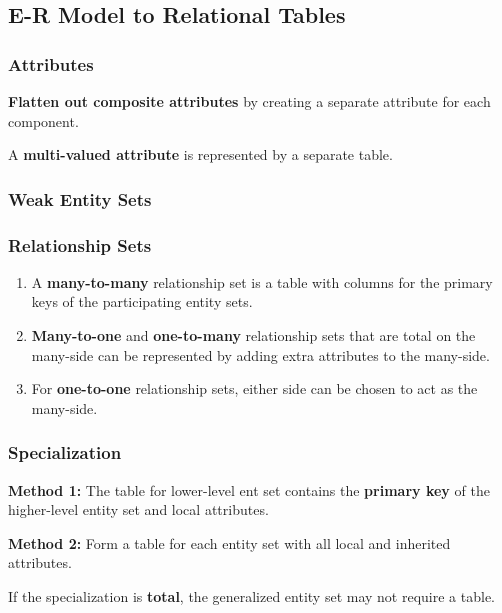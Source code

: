 \documentclass[11pt,a4paper]{article}
\begin{document}
\subsection{E-R Model to Relational Tables}
\subsubsection{Attributes}
\textbf{Flatten out composite attributes} by creating a separate attribute for each component.

A \textbf{multi-valued attribute} is represented by a separate table.

\subsubsection{Weak Entity Sets}

\subsubsection{Relationship Sets}
\begin{enumerate}
    \item [1.] A \textbf{many-to-many} relationship set is a table with columns for the primary keys of the participating entity sets.
    
    \item [2.]\textbf{Many-to-one} and \textbf{one-to-many} relationship sets that are total on the many-side can be represented by adding extra attributes to the many-side.
    
    \item [3.] For \textbf{one-to-one} relationship sets, either side can be chosen to act as the many-side.

\end{enumerate}

\subsubsection{Specialization}
\textbf{Method 1: } The table for lower-level ent set contains the \textbf{primary key} of the higher-level entity set and local attributes. \par
    
\textbf{Method 2: } Form a table for each entity set with all local and inherited attributes. \par
If the specialization is \textbf{total}, the generalized entity set may not require a table.
\end{document}
